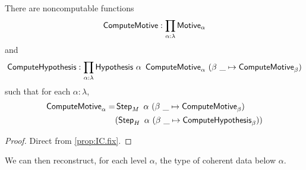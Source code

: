 \begin{theorem}
  \label{thm:model_construction}
  There are noncomputable functions
  \[ \operatorname{\mathsf{ComputeMotive}} : \prod_{\alpha : \lambda} \mathsf{Motive}_\alpha \]
  and
  \[ \newoperator{ComputeHypothesis} : \prod_{\alpha : \lambda} \Hypothesis\ \alpha\ \newoperator{ComputeMotive}_\alpha\ (\beta\ \_ \mapsto \newoperator{ComputeMotive}_\beta) \]
  such that for each \( \alpha : \lambda \),
  \begin{align*}
    \newoperator{ComputeMotive}_\alpha = &\newoperator{Step}_M\ \alpha\ (\beta\ \_ \mapsto \newoperator{ComputeMotive}_\beta)\\
    &(\newoperator{Step}_H\ \alpha\ (\beta\ \_ \mapsto \newoperator{ComputeHypothesis}_\beta))
  \end{align*}
\end{theorem}
\begin{proof}
  Direct from \cref{prop:IC.fix}.
\end{proof}
We can then reconstruct, for each level \( \alpha \), the type of coherent data below \( \alpha \).
